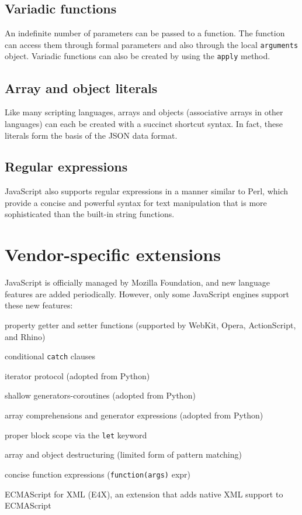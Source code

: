 \subsection{Variadic functions}


An indefinite number of parameters can be passed to a function. The function can access them through formal parameters and also through the local \texttt{arguments} object. Variadic functions can also be created by using the \texttt{apply} method.



\subsection{Array and object literals}

Like many scripting languages, arrays and objects (associative arrays in other languages) can each be created with a succinct shortcut syntax. In fact, these literals form the basis of the JSON data format.


\subsection{Regular expressions}


JavaScript also supports regular expressions in a manner similar to Perl, which provide a concise and powerful syntax for text manipulation that is more sophisticated than the built-in string functions.




\section{Vendor-specific extensions}


JavaScript is officially managed by Mozilla Foundation, and new language features are added periodically. However, only some JavaScript engines support these new features:


\begin{compactitem}
\item property getter and setter functions (supported by WebKit, Opera, ActionScript, and Rhino)
\item conditional \texttt{catch} clauses
\item iterator protocol (adopted from Python)
\item shallow generators-coroutines (adopted from Python)
\item array comprehensions and generator expressions (adopted from Python)
\item proper block scope via the \texttt{let} keyword
\item array and object destructuring (limited form of pattern matching)
\item concise function expressions (\texttt{function(args)} expr)
\item ECMAScript for XML (E4X), an extension that adds native XML support to ECMAScript
\end{compactitem}







